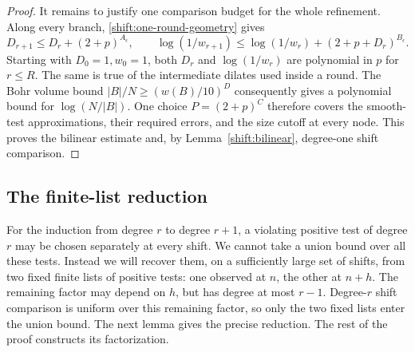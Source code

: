 \begin{proof}
It remains to justify one comparison budget for the whole refinement.
Along every branch, \eqref{shift:one-round-geometry} gives
\[
 D_{r+1}\le D_r+(2+p)^{A_\epsilon},\qquad
 \log(1/w_{r+1})\le\log(1/w_r)+(2+p+D_r)^{B_\epsilon}.
\]
Starting with $D_0=1,w_0=1$, both $D_r$ and $\log(1/w_r)$ are
polynomial in $p$ for $r\le R$. The same is true of the intermediate
dilates used inside a round. The Bohr volume bound
$|B|/N\ge(w(B)/10)^D$ consequently gives a polynomial bound for
$\log(N/|B|)$. One choice $P=(2+p)^C$ therefore covers the
smooth-test approximations, their required errors, and the size
cutoff at every node. This proves the bilinear estimate and, by
Lemma~\ref{shift:bilinear}, degree-one shift comparison.
\end{proof}

\subsection{The finite-list reduction}

For the induction from degree $r$ to degree $r+1$, a violating
positive test of degree $r$ may be chosen separately at every shift.
We cannot take a union bound over all these tests. Instead we will
recover them, on a sufficiently large set of shifts, from two fixed
finite lists of positive tests: one observed at $n$, the other at
$n+h$. The remaining factor may depend on $h$, but has degree at
most $r-1$. Degree-$r$ shift comparison is uniform over this remaining
factor, so only the two fixed lists enter the union bound.
The next lemma gives the precise reduction. The rest of the proof
constructs its factorization.

